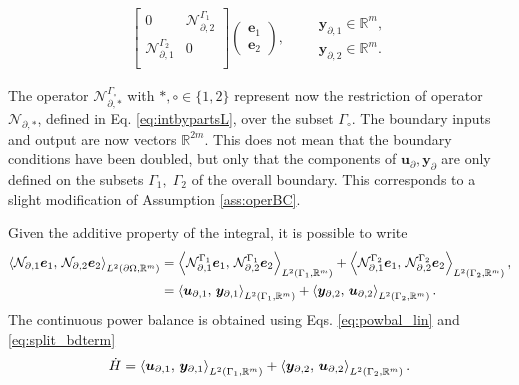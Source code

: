 \begin{subequations}
\begin{align}
\begin{bmatrix}
0 & \mathcal{N}_{\partial, 2}^{\Gamma_1} \\
\mathcal{N}_{\partial, 1}^{\Gamma_2} & 0\\
\end{bmatrix} \begin{pmatrix}
\bm{e}_1 \\ \bm{e}_2
\end{pmatrix}, \qquad
\begin{aligned}
\bm{y}_{\partial, 1} \in \mathbb{R}^{m},\\
\bm{y}_{\partial, 2} \in \mathbb{R}^{m}.
\end{aligned}
\end{align}
\end{subequations}

 The operator $\mathcal{N}_{\partial, *}^{\Gamma_\circ}$ with $*, \circ \in \{1, 2\}$ represent now the restriction of operator $\mathcal{N}_{\partial, *}$, defined in Eq. \eqref{eq:intbypartsL}, over the subset $\Gamma_\circ$.  The boundary inputs and output are now vectors $\mathbb{R}^{2m}$. This does not mean that the boundary conditions have been doubled, but only that the components of $\bm{u}_\partial, \bm{y}_\partial$ are only defined on the subsets $\Gamma_1, \; \Gamma_2$ of the overall boundary. This corresponds to a slight modification of Assumption \ref{ass:operBC}.
 
 
Given the additive property of the integral, it is possible to write
\begin{equation}\label{eq:split_bdterm}
\begin{aligned}
\inner[L^2(\partial \Omega, \mathbb{R}^m)]{\mathcal{N}_{\partial, 1}\bm{e}_1}{\mathcal{N}_{\partial, 2}\bm{e}_2} &= \inner[L^2(\Gamma_1, \mathbb{R}^m)]{\mathcal{N}_{\partial, 1}^{\Gamma_1}\bm{e}_1}{\mathcal{N}_{\partial, 2}^{\Gamma_1}\bm{e}_2} + \inner[L^2({\Gamma_2, \mathbb{R}^m})]{\mathcal{N}_{\partial, 1}^{\Gamma_2}\bm{e}_1}{\mathcal{N}_{\partial, 2}^{\Gamma_2}\bm{e}_2}, \\
&= \inner[L^2({\Gamma_1, \mathbb{R}^m})]{\bm{u}_{\partial, 1}}{\bm{y}_{\partial, 1}} + \inner[L^2({\Gamma_2, \mathbb{R}^m})]{\bm{y}_{\partial, 2}}{\bm{u}_{\partial, 2}}.
\end{aligned} 
\end{equation}
The continuous power balance is obtained using Eqs. \eqref{eq:powbal_lin} and \eqref{eq:split_bdterm}
\begin{equation}\label{eq:powbal_mixed}
	\dot{H} = \inner[L^2({\Gamma_1}, \mathbb{R}^m)]{\bm{u}_{\partial, 1}}{\bm{y}_{\partial, 1}} + \inner[L^2({\Gamma_2}, \mathbb{R}^m)]{\bm{y}_{\partial, 2}}{\bm{u}_{\partial, 2}}.
\end{equation}
 


